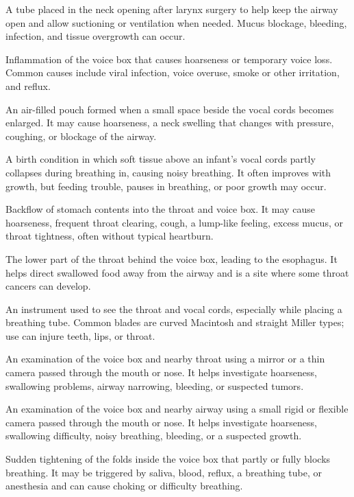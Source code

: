  A tube placed in the neck opening after larynx surgery to help keep the airway open and allow suctioning or ventilation when needed. Mucus blockage, bleeding, infection, and tissue overgrowth can occur.

 Inflammation of the voice box that causes hoarseness or temporary voice loss. Common causes include viral infection, voice overuse, smoke or other irritation, and reflux.

 An air-filled pouch formed when a small space beside the vocal cords becomes enlarged. It may cause hoarseness, a neck swelling that changes with pressure, coughing, or blockage of the airway.

 A birth condition in which soft tissue above an infant’s vocal cords partly collapses during breathing in, causing noisy breathing. It often improves with growth, but feeding trouble, pauses in breathing, or poor growth may occur.

 Backflow of stomach contents into the throat and voice box. It may cause hoarseness, frequent throat clearing, cough, a lump-like feeling, excess mucus, or throat tightness, often without typical heartburn.

 The lower part of the throat behind the voice box, leading to the esophagus. It helps direct swallowed food away from the airway and is a site where some throat cancers can develop.

 An instrument used to see the throat and vocal cords, especially while placing a breathing tube. Common blades are curved Macintosh and straight Miller types; use can injure teeth, lips, or throat.

 An examination of the voice box and nearby throat using a mirror or a thin camera passed through the mouth or nose. It helps investigate hoarseness, swallowing problems, airway narrowing, bleeding, or suspected tumors.

 An examination of the voice box and nearby airway using a small rigid or flexible camera passed through the mouth or nose. It helps investigate hoarseness, swallowing difficulty, noisy breathing, bleeding, or a suspected growth.

 Sudden tightening of the folds inside the voice box that partly or fully blocks breathing. It may be triggered by saliva, blood, reflux, a breathing tube, or anesthesia and can cause choking or difficulty breathing.

